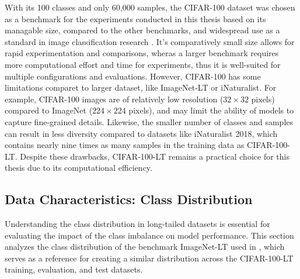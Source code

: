 With its 100 classes and only 60,000 samples, the CIFAR-100 dataset was chosen as a benchmark for the experiments conducted in this thesis based on its managable size, compared to the other benchmarks, and widespread use as a standard in image classification research . It's comparatively small size allows for rapid experimentation and comparisons, wheras a larger benchmark requires more computational effort and time for experiments, thus it is well-suited for multiple configurations and evaluations. However, CIFAR-100 has some limitations comparet to larger dataset, like ImageNet-LT or iNaturalist. For example, CIFAR-100 images are of relatively low resolution ($32 \times 32$ pixels) compared to ImageNet ($224 \times 224$ pixels), and may limit the ability of models to capture fine-grained details. Likewise, the smaller number of classes and samples can result in less diversity compared to datasets like iNaturalist 2018, which contains nearly nine times as many samples in the training data as CIFAR-100-LT. Despite these drawbacks, CIFAR-100-LT remains a practical choice for this thesis due to its computational efficiency. 


\subsection{Data Characteristics: Class Distribution}
Understanding the class distribution in long-tailed datasets is essential for evaluating the impact of the class imbalance on model performance. This section analyzes the class distribution of the benchmark ImageNet-LT used in \cite{zhang2023deep}, which serves as a reference for creating a similar distribution across the CIFAR-100-LT training, evaluation, and test datasets.  

